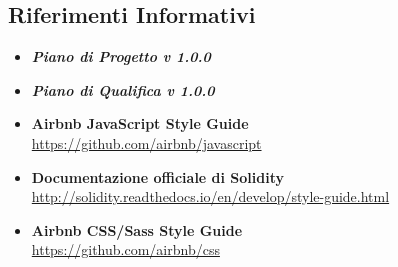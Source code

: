 \documentclass[NormeDiProgetto.tex]{subfiles}
\begin{document}
\subsection{Riferimenti Informativi}
\begin{itemize}
	\item \textbf{\textit{Piano di Progetto v 1.0.0}}
	\item \textbf{\textit{Piano di Qualifica v 1.0.0}}
	\item \textbf{Airbnb JavaScript Style Guide}\\
	\href{https://github.com/airbnb/javascript}{https://github.com/airbnb/javascript}
	\item \textbf{Documentazione officiale di Solidity}\\
	\href{http://solidity.readthedocs.io/en/develop/style-guide.html}{http://solidity.readthedocs.io/en/develop/style-guide.html}
	\item \textbf{Airbnb CSS/Sass Style Guide}\\
	\href{https://github.com/airbnb/css}{https://github.com/airbnb/css}
\end{itemize}
\end{document}
